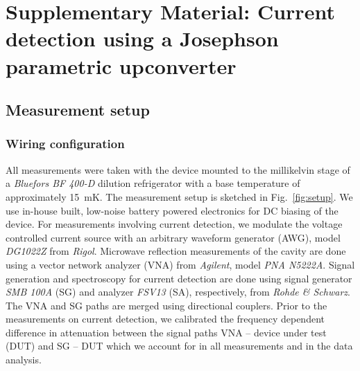 
%



\pagebreak
\clearpage



\section{Supplementary Material: Current detection using a Josephson parametric upconverter}


\subsection{Measurement setup}\label{sec:measurement}

\subsubsection{Wiring configuration}

All measurements were taken with the device mounted to the millikelvin stage of a \textit{Bluefors BF 400-D} dilution refrigerator with a base temperature of approximately \SI{15}{\milli\kelvin}.
% 
The measurement setup is sketched in Fig.~\ref{fig:setup}.
% 
We use in-house built, low-noise battery powered electronics for DC biasing of the device.
% 
For measurements involving current detection, we modulate the voltage controlled current source with an arbitrary waveform generator (AWG), model \textit{DG1022Z} from \textit{Rigol}.
% 
Microwave reflection measurements of the cavity are done using a vector network analyzer (VNA) from \textit{Agilent}, model \textit{PNA N5222A}.
% 
Signal generation and spectroscopy for current detection are done using signal generator \textit{SMB 100A} (SG) and analyzer \textit{FSV13} (SA), respectively, from \textit{Rohde \& Schwarz}.
% 
The VNA and SG paths are merged using directional couplers.
% 
Prior to the measurements on current detection, we calibrated the frequency dependent difference in attenuation between the signal paths VNA -- device under test (DUT) and SG -- DUT which we account for in all measurements and in the data analysis.

